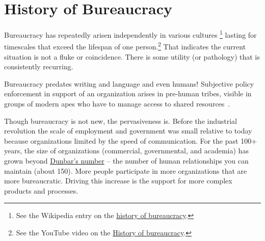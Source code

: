 \section{History of Bureaucracy\label{sec:history}}


Bureaucracy has repeatedly arisen independently in various cultures
\footnote{See the Wikipedia entry on the \href{https://en.wikipedia.org/wiki/Bureaucracy\%23History}{history of bureaucracy}.
}
lasting for timescales that exceed the lifespan of one person.\footnote{See the YouTube video on the \href{https://www.youtube.com/watch?v=B_nsZlcC12g}{History of bureaucracy}.} That indicates the current situation is not a fluke or coincidence. There is some utility (or pathology) that is consistently recurring. 


Bureaucracy predates writing and language and even humans! Subjective policy enforcement in support of an organization arises in pre-human tribes, visible in groups of modern apes who have to manage access to shared resources~\cite{2016_Suchak}. 



Though bureaucracy is not new, the pervasiveness is. Before the industrial revolution the scale of employment and government was small relative to today because organizations limited by the speed of communication. For the past 100+ years, the size of organizations (commercial, governmental, and academia) has grown beyond \href{https://en.wikipedia.org/wiki/Dunbar\%27s_number}{Dunbar's number} -- the number of human relationships you can maintain (about 150). \iftoggle{WPinmargin}{\marginpar{$>$Wikipedia: Dunbar's number}}{}
More people participate in more organizations that are more bureaucratic. Driving this increase is the support for more complex products and processes. 



